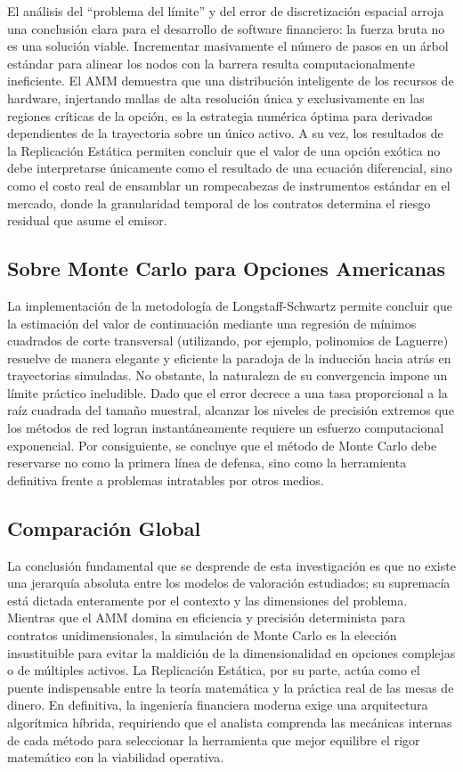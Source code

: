 El análisis del ``problema del límite'' y del error de discretización espacial arroja una conclusión clara para el desarrollo de software financiero: la fuerza bruta no es una solución viable. Incrementar masivamente el número de pasos en un árbol estándar para alinear los nodos con la barrera resulta computacionalmente ineficiente. El AMM demuestra que una distribución inteligente de los recursos de hardware, injertando mallas de alta resolución única y exclusivamente en las regiones críticas de la opción, es la estrategia numérica óptima para derivados dependientes de la trayectoria sobre un único activo. A su vez, los resultados de la Replicación Estática permiten concluir que el valor de una opción exótica no debe interpretarse únicamente como el resultado de una ecuación diferencial, sino como el costo real de ensamblar un rompecabezas de instrumentos estándar en el mercado, donde la granularidad temporal de los contratos determina el riesgo residual que asume el emisor.

\subsection{Sobre Monte Carlo para Opciones Americanas}

La implementación de la metodología de Longstaff-Schwartz permite concluir que la estimación del valor de continuación mediante una regresión de mínimos cuadrados de corte transversal (utilizando, por ejemplo, polinomios de Laguerre) resuelve de manera elegante y eficiente la paradoja de la inducción hacia atrás en trayectorias simuladas. No obstante, la naturaleza de su convergencia impone un límite práctico ineludible. Dado que el error decrece a una tasa proporcional a la raíz cuadrada del tamaño muestral, alcanzar los niveles de precisión extremos que los métodos de red logran instantáneamente requiere un esfuerzo computacional exponencial. Por consiguiente, se concluye que el método de Monte Carlo debe reservarse no como la primera línea de defensa, sino como la herramienta definitiva frente a problemas intratables por otros medios.

\subsection{Comparación Global}

La conclusión fundamental que se desprende de esta investigación es que no existe una jerarquía absoluta entre los modelos de valoración estudiados; su supremacía está dictada enteramente por el contexto y las dimensiones del problema. Mientras que el AMM domina en eficiencia y precisión determinista para contratos unidimensionales, la simulación de Monte Carlo es la elección insustituible para evitar la maldición de la dimensionalidad en opciones complejas o de múltiples activos. La Replicación Estática, por su parte, actúa como el puente indispensable entre la teoría matemática y la práctica real de las mesas de dinero. En definitiva, la ingeniería financiera moderna exige una arquitectura algorítmica híbrida, requiriendo que el analista comprenda las mecánicas internas de cada método para seleccionar la herramienta que mejor equilibre el rigor matemático con la viabilidad operativa.

